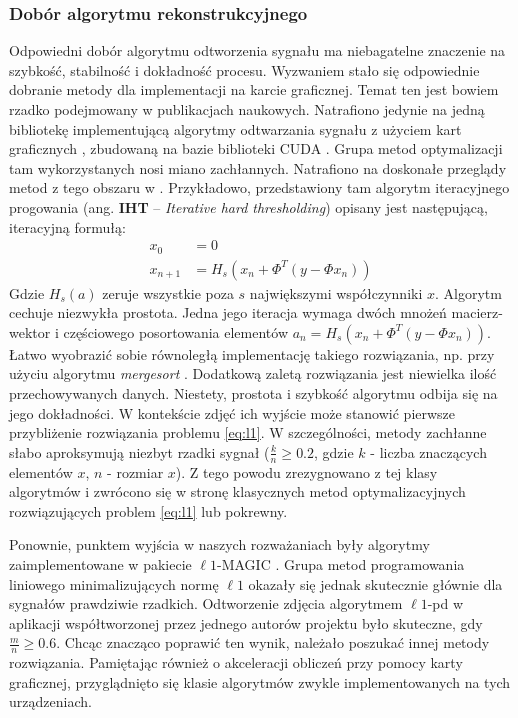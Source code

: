\subsubsection{Dobór algorytmu rekonstrukcyjnego}
Odpowiedni dobór algorytmu odtworzenia sygnału ma niebagatelne znaczenie na szybkość, stabilność i dokładność procesu. Wyzwaniem stało się odpowiednie dobranie metody dla implementacji na karcie graficznej. Temat ten jest bowiem rzadko podejmowany w publikacjach naukowych. Natrafiono jedynie na jedną bibliotekę implementującą algorytmy odtwarzania sygnału z użyciem kart graficznych \cite{GAGA}, zbudowaną na bazie biblioteki CUDA \cite{CUDA}. Grupa metod optymalizacji tam wykorzystanych nosi miano zachłannych. Natrafiono na doskonałe przeglądy metod z tego obszaru w \cite{Needell2009,Gronde2008}. Przykładowo, przedstawiony tam algorytm iteracyjnego progowania (ang. \textbf{IHT} -- \textit{Iterative hard thresholding}) \cite{Blumensath2009} opisany jest następującą, iteracyjną formułą: 
\begin{equation}
\begin{split}
    x_0 & = 0 \\ 
x_{n+1} & = H_s \left(x_n + \Phi^T(y - \Phi x_n) \right)
\end{split}
\end{equation}
\newline{}
Gdzie $H_s(a)$ zeruje wszystkie poza $s$ największymi współczynniki $x$. Algorytm cechuje niezwykła prostota. Jedna jego iteracja wymaga dwóch mnożeń macierz-wektor i częściowego posortowania elementów $a_n =  H_s \left(x_n + \Phi^T(y - \Phi x_n) \right)$. Łatwo wyobrazić sobie równoległą implementację takiego rozwiązania, np. przy użyciu algorytmu \textit{mergesort} \cite{Thouti2012}. Dodatkową zaletą rozwiązania jest niewielka ilość przechowywanych danych. Niestety, prostota i szybkość algorytmu odbija się na jego dokładności. W kontekście zdjęć ich wyjście może stanowić pierwsze przybliżenie rozwiązania problemu \ref{eq:l1}. W szczególności, metody zachłanne słabo aproksymują niezbyt rzadki sygnał ($\frac{k}{n} \ge 0.2$, gdzie $k$ - liczba znaczących elementów $x$, $n$ - rozmiar $x$). Z tego powodu zrezygnowano z tej klasy algorytmów i zwrócono się w stronę klasycznych metod optymalizacyjnych rozwiązujących problem \ref{eq:l1} lub pokrewny.

Ponownie, punktem wyjścia w naszych rozważaniach były algorytmy zaimplementowane w pakiecie $\ell 1$-MAGIC \cite{SinglePixelCameraCode}. Grupa metod programowania liniowego minimalizujących normę $\ell 1$ okazały się jednak skutecznie głównie dla sygnałów prawdziwie rzadkich. Odtworzenie zdjęcia algorytmem $\ell 1$-pd \cite{Boyd2004} w aplikacji współtworzonej przez jednego autorów projektu \cite{PR12SIS306} było skuteczne, gdy $\frac{m}{n} \ge  0.6$. Chcąc znacząco poprawić ten wynik, należało poszukać innej metody rozwiązania. Pamiętając również o akceleracji obliczeń przy pomocy karty graficznej, przyglądnięto się klasie algorytmów zwykle implementowanych na tych urządzeniach. 

